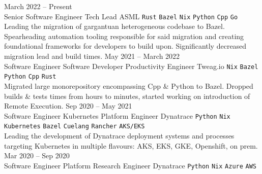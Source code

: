 \documentclass[9pt]{style/developercv}
\begin{document}
\begin{entrylist}
    \entry
      {March 2022 -- Present\\\footnotesize{Senior Software Engineer}}
        {Tech Lead}
        {ASML}
        {
            \texttt{Rust}\slashsep
            \texttt{Bazel}\slashsep
            \texttt{Nix}\slashsep
            \texttt{Python}\slashsep
            \texttt{Cpp}\slashsep
            \texttt{Go}\\

            Leading the migration of gargantuan heterogeneous codebase to Bazel. Spearheading automation tooling responsible for said migration and creating foundational frameworks for developers to build upon. Significantly decreased migration lead and build times. 
      }
    \entry
      {May 2021 -- March 2022\\\footnotesize{Software Engineer}}
        {Software Developer Productivity Engineer}
        {Tweag.io}
        {
            \texttt{Nix}\slashsep
            \texttt{Bazel}\slashsep
            \texttt{Python}\slashsep
            \texttt{Cpp}\slashsep
            \texttt{Rust}\\

            Migrated large monorepository encompassing Cpp \& Python to Bazel.
            Dropped builds \& tests times from hours to minutes, started working on introduction of Remote Execution.
      }
    \entry
      {Sep 2020 -- May 2021 \\\footnotesize{Software Engineer}}
        {Kubernetes Platform Engineer}
        {Dynatrace}
        {
            \texttt{Python}\slashsep
            \texttt{Nix}\slashsep
            \texttt{Kubernetes}\slashsep
            \texttt{Bazel}\slashsep
            \texttt{Cuelang}\slashsep
            \texttt{Rancher}\slashsep
            \texttt{AKS/EKS}\\

            Leading the development of Dynatrace deployment systems and processes targeting Kubernetes in
            multiple flavours: AKS, EKS, GKE, Openshift, on prem.
      }
    \entry
      {Mar 2020 -- Sep 2020\\\footnotesize{Software Engineer}}
        {Platform Research Engineer}
        {Dynatrace}
        {
            \texttt{Python}\slashsep
            \texttt{Nix}\slashsep
            \texttt{Azure}\slashsep
            \texttt{AWS}\\

}
\end{entrylist}
\end{document}
